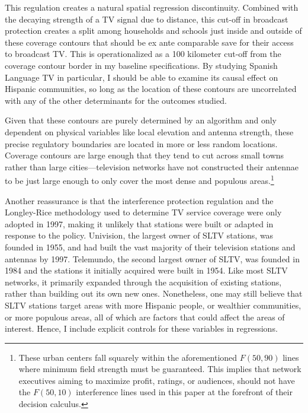\documentclass[11pt]{article}
\begin{document}

This regulation creates a natural spatial regression discontinuity. Combined with the decaying strength of a TV signal due to distance, this cut-off in broadcast protection creates a split among households and schools just inside and outside of these coverage contours that should be ex ante comparable save for their access to broadcast TV. This is operationalized as a 100 kilometer cut-off from the coverage contour border in my baseline specifications. By studying Spanish Language TV in particular, I should be able to examine its causal effect on Hispanic communities, so long as the location of these contours are uncorrelated with any of the other determinants for the outcomes studied. 

Given that these contours are purely determined by an algorithm and only dependent on physical variables like local elevation and antenna strength, these precise regulatory boundaries are located in more or less random locations. Coverage contours are large enough that they tend to cut across small towns rather than large cities---television networks have not constructed their antennae to be just large enough to only cover the most dense and populous areas.\footnote{ These urban centers fall squarely within the aforementioned $F(50,90)$ lines where minimum field strength must be guaranteed. This implies that network executives aiming to maximize profit, ratings, or audiences, should not have the $F(50,10)$ interference lines used in this paper at the forefront of their decision calculus.} 

Another reassurance is that the interference protection regulation and the Longley-Rice methodology used to determine TV service coverage were only adopted in 1997, making it unlikely that stations were built or adapted in response to the policy. Univision, the largest owner of SLTV stations, was founded in 1955, and had built the vast majority of their television stations and antennas by 1997. Telemundo, the second largest owner of SLTV, was founded in 1984 and the stations it initially acquired were built in 1954. Like most SLTV networks, it primarily expanded through the acquisition of existing stations, rather than building out its own new ones. Nonetheless, one may still believe that SLTV stations target areas with more Hispanic people, or wealthier communities, or more populous areas, all of which are factors that could affect the areas of interest. Hence, I include explicit controls for these variables in regressions.
\end{document}
